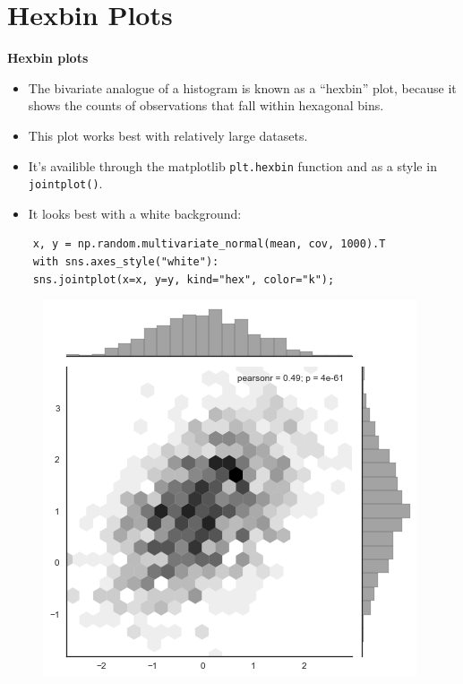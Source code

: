 \documentclass{beamer}
\begin{document}
\section{Hexbin Plots}
\begin{frame}[fragile]
	\large
	\noindent \textbf{Hexbin plots}
	\begin{itemize}
		\item The bivariate analogue of a histogram is known as a “hexbin” plot, because it shows the counts of observations that fall within hexagonal bins. \item This plot works best with relatively large datasets. 
		\item It’s availible through the matplotlib \texttt{plt.hexbin} function and as a style in \texttt{jointplot()}. 
		\item It looks best with a white background:
	\end{itemize}
	
\end{frame}
\begin{frame}[fragile]
	\begin{verbatim}
	x, y = np.random.multivariate_normal(mean, cov, 1000).T
	with sns.axes_style("white"):
	sns.jointplot(x=x, y=y, kind="hex", color="k");
	\end{verbatim}
	
	\begin{figure}
		\centering
		\includegraphics[width=0.7\linewidth]{images/distributions_32_0}
		
	\end{figure}
	
\end{frame}
\end{document}
